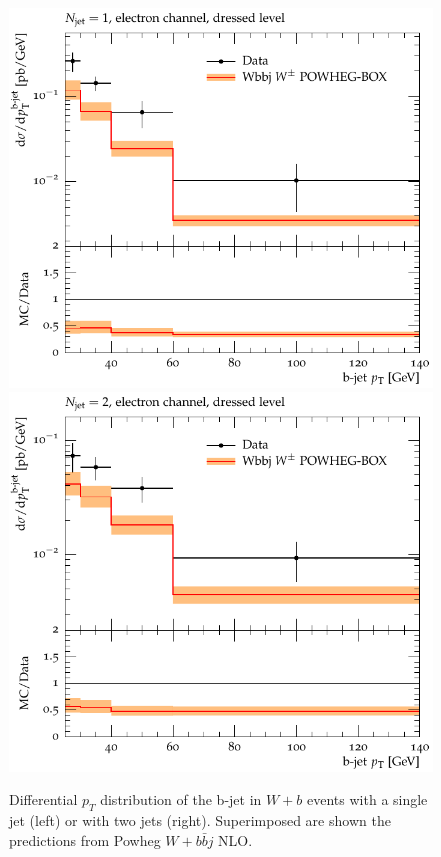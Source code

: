 \documentclass[11pt]{cernrep} \usepackage{graphicx,epsfig} 
\newcommand{\pt}{\ensuremath{p_{T}}\xspace}
\begin{document}
\begin{figure}[htbp]
\begin{center}
   \includegraphics[scale=0.65]{figs/wbb/powheg/d02-x01-y01.pdf}
   \includegraphics[scale=0.65]{figs/wbb/powheg/d02-x02-y01.pdf}
\end{center}
\caption{Differential \pt distribution of the b-jet in $W+b$ events with a single jet (left) or with two jets (right). Superimposed are
shown the predictions from Powheg $W+b\bar{b}j$ NLO.}
\label{wbb-pt-powheg}
\end{figure}
\end{document}
